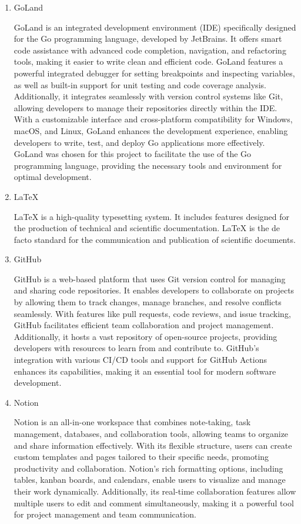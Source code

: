 \documentclass[conference]{IEEEtran}
\begin{document}
\begin{enumerate}[itemsep=2ex, parsep=1ex]
		\item GoLand

			GoLand is an integrated development environment (IDE) specifically
			designed for the Go programming language, developed by JetBrains. It
			offers smart code assistance with advanced code completion, navigation,
			and refactoring tools, making it easier to write clean and efficient code.
			GoLand features a powerful integrated debugger for setting breakpoints and
			inspecting variables, as well as built-in support for unit testing and code
			coverage analysis. Additionally, it integrates seamlessly with version control
			systems like Git, allowing developers to manage their repositories
			directly within the IDE. With a customizable interface and cross-platform compatibility
			for Windows, macOS, and Linux, GoLand enhances the development experience,
			enabling developers to write, test, and deploy Go applications more effectively.
			GoLand was chosen for this project to facilitate the use of the Go
			programming language, providing the necessary tools and environment for optimal
			development.

		\item LaTeX

			LaTeX is a high-quality typesetting system. It includes features designed for
			the production of technical and scientific documentation. LaTeX is the de
			facto standard for the communication and publication of scientific
			documents.

		\item GitHub

			GitHub is a web-based platform that uses Git version control for managing
			and sharing code repositories. It enables developers to collaborate on projects
			by allowing them to track changes, manage branches, and resolve conflicts seamlessly.
			With features like pull requests, code reviews, and issue tracking, GitHub
			facilitates efficient team collaboration and project management.
			Additionally, it hosts a vast repository of open-source projects,
			providing developers with resources to learn from and contribute to. GitHub's
			integration with various CI/CD tools and support for GitHub Actions enhances
			its capabilities, making it an essential tool for modern software
			development.

		\item Notion

			Notion is an all-in-one workspace that combines note-taking, task management,
			databases, and collaboration tools, allowing teams to organize and share
			information effectively. With its flexible structure, users can create
			custom templates and pages tailored to their specific needs, promoting productivity
			and collaboration. Notion's rich formatting options, including tables,
			kanban boards, and calendars, enable users to visualize and manage their
			work dynamically. Additionally, its real-time collaboration features allow
			multiple users to edit and comment simultaneously, making it a powerful tool
			for project management and team communication.


\end{enumerate}
\end{document}
